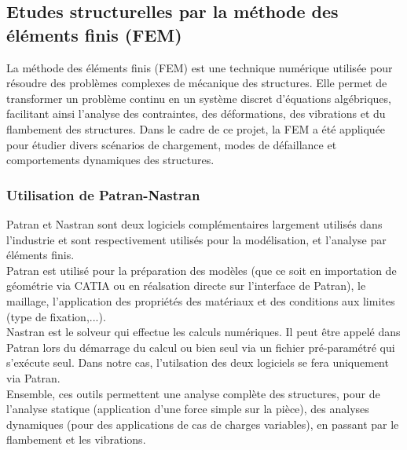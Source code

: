 \subsection{Etudes structurelles par la méthode des éléments finis (\acrshort{FEM})}

La méthode des éléments finis (\acrshort{FEM}) est une technique numérique 
utilisée pour résoudre des problèmes complexes de mécanique des structures. Elle permet 
de transformer un problème continu en un système discret d'équations algébriques, 
facilitant ainsi l'analyse des contraintes, des déformations, des vibrations et du 
flambement des structures. Dans le cadre de ce projet, la \acrshort{FEM} a été appliquée 
pour étudier divers scénarios de chargement, modes de défaillance et comportements 
dynamiques des structures.

\subsubsection{Utilisation de Patran-Nastran}

Patran et Nastran sont deux logiciels complémentaires largement utilisés dans l'industrie
et sont respectivement utilisés pour la modélisation, et l'analyse par éléments finis.\\
Patran est utilisé pour la préparation des modèles (que ce soit en importation de géométrie 
via CATIA ou en réalsation directe sur l'interface de Patran), le maillage, 
l'application des propriétés des matériaux et des conditions aux limites (type de fixation,...).\\
Nastran est le solveur qui effectue les calculs numériques. Il peut être appelé dans 
Patran lors du démarrage du calcul ou bien seul via un fichier pré-paramétré qui 
s'exécute seul. Dans notre cas, l'utilsation des deux logiciels se fera uniquement via 
Patran.\\
Ensemble, ces outils permettent une analyse complète des structures, pour de l'analyse statique 
(application d'une force simple sur la pièce), des analyses dynamiques (pour des applications 
de cas de charges variables), en passant par le flambement et les vibrations.\\
 

